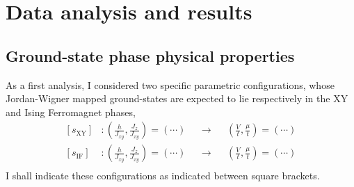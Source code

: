 \clearpage
\section{Data analysis and results}

\todo

\subsection{Ground-state phase physical properties}

As a first analysis, I considered two specific parametric configurations, whose Jordan-Wigner mapped ground-states are expected to lie respectively in the $\mathrm{XY}$ and Ising Ferromagnet phases,
\[
	\begin{aligned}
		[s_\mathrm{XY}] &\colon \left(
			\frac{h}{J_{xy}}, \frac{J_{z}}{J_{xy}}
		\right) = \left(
			\cdots
		\right) &&\to &&\left(
			\frac{V}{t}, \frac{\mu}{t}
		\right) = \left(
			\cdots
		\right) \\
		[s_\mathrm{IF}] &\colon \left(
			\frac{h}{J_{xy}}, \frac{J_{z}}{J_{xy}}
		\right) = \left(
			\cdots
		\right) &&\to &&\left(
			\frac{V}{t}, \frac{\mu}{t}
		\right) = \left(
			\cdots
		\right) \\
	\end{aligned}
\]
I shall indicate these configurations as indicated between square brackets.

{\color{tabred}}

\todo